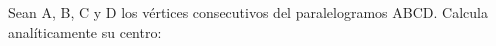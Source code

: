 \documentclass[addpoints,spanish, 12pt,a4paper]{exam}
\begin{document}
\begin{questions}

\question Sean A, B, C y D los vértices consecutivos del paralelogramos ABCD. Calcula analíticamente su centro: \begin{parts} 

\end{parts}
\end{questions}
\end{document}
